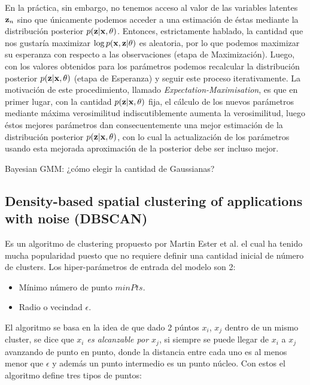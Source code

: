 En la práctica, sin embargo, no tenemos acceso al valor de las variables latentes $\mathbf{z}_n$ sino que únicamente podemos acceder a una estimación de éstas mediante la distribución posterior $p(\mathbf{z}|\mathbf{x},	\theta)$. Entonces, estrictamente hablado, la cantidad que nos gustaría maximizar $\log p(\mathbf{x}, \mathbf{z} |\theta)$ es aleatoria, por lo que podemos maximizar su esperanza con respecto a las observaciones (etapa de Maximización). Luego, con los valores obtenidos para los parámetros podemos recalcular la distribución posterior $p(\mathbf{z}|\mathbf{x},\theta)$ (etapa de Esperanza) y seguir este proceso iterativamente. La motivación de este procedimiento, llamado \emph{Expectation-Maximisation}, es que en primer lugar, con la cantidad $p(\mathbf{z}|\mathbf{x},\theta)$ fija, el cálculo de los nuevos parámetros mediante máxima verosimilitud indiscutiblemente aumenta la verosimilitud, luego éstos mejores parámetros dan consecuentemente una mejor estimación de la distribución posterior $p(\mathbf{z}|\mathbf{x},\theta)$, con lo cual la actualización de los parámetros usando esta mejorada aproximación de la posterior debe ser incluso mejor. 

\begin{mdframed}[style=pendiente, frametitle={\center discusión}]
Bayesian GMM: ¿cómo elegir la cantidad de Gaussianas?
\end{mdframed}




\subsection{Density-based spatial clustering of applications with noise (DBSCAN)}

Es un algoritmo de clustering propuesto por Martin Ester et al. el cual ha tenido mucha popularidad puesto que no requiere definir una cantidad inicial de número de clusters. Los hiper-parámetros de entrada del modelo son 2:

\begin{itemize}
    \item Mínimo número de punto $minPts$.
    \item Radio o vecindad $\epsilon$.
\end{itemize}

El algoritmo se basa en la idea de que dado 2 púntos $x_i$, $x_j$ dentro de un mismo cluster, se dice que \emph{$x_i$ es alcanzable por $x_j$}, si siempre se puede llegar de $x_i$ a $x_j$ avanzando de punto en punto, donde la distancia entre cada uno es al menos menor que $\epsilon$ y además un punto intermedio es un punto núcleo. Con estos el algoritmo define tres tipos de puntos:

